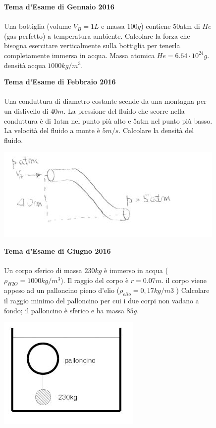 \begin{figure}[h!]
\textbf{Tema d'Esame di Gennaio 2016}\\ \\
Una bottiglia (volume $V_B=1L$ e massa $100 g$) contiene $50$atm di $He$ (gas perfetto) a
temperatura ambiente. Calcolare la forza che bisogna esercitare verticalmente sulla bottiglia
per tenerla completamente immersa in acqua. Massa atomica $He= 6.64 \cdot 10^{24} g$. densità
acqua $1000 kg/m^3$.

\end{figure}

\begin{figure}[h!]
\textbf{Tema d'Esame di Febbraio 2016}\\ \\
Una conduttura di diametro costante scende da una montagna per un dislivello di $40m$. La pressione del fluido che scorre nella conduttura è di $1$atm nel punto più alto e $5$atm nel punto più basso. La velocità del fluido a monte è $5m/s$. Calcolare la densità del fluido.
\begin{center}
		\includegraphics[scale=1.1]{ES4/FEB042016.jpg}
	\end{center}
\end{figure}

\begin{figure}[h!]
\textbf{Tema d'Esame di Giugno 2016}\\ \\
Un corpo sferico di massa $230 kg$ è immerso in acqua ($\rho_{H2O} = 1000kg/m^3 $). Il raggio del corpo
è $r = 0.07 m$. il corpo viene appeso ad un palloncino pieno d'elio ($\rho_{elio} = 0,17 kg/m3$ ) Calcolare il raggio minimo del palloncino per cui i due corpi non vadano a fondo; il palloncino è sferico e ha massa $85g$.
\begin{center}
		\includegraphics[scale=1.1]{ES4/GIU042016.jpg}
	\end{center}
\end{figure}

